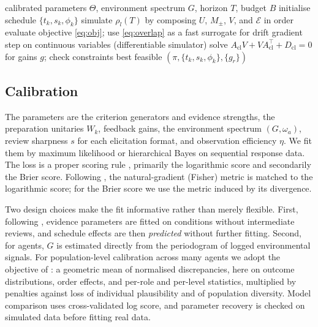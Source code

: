 \documentclass[11pt]{article}
\theoremstyle{definition}
\theoremstyle{remark}
\begin{document}
\begin{algorithm}[t]
\caption{Schedule and order optimisation}
\label{alg:opt}
\begin{algorithmic}[1]
\Require calibrated parameters $\Theta$, environment spectrum $G$, horizon $T$, budget $B$
  \State initialise schedule $\{t_k,s_k,\phi_k\}$
  \Repeat
    \State simulate $\rho_l(T)$ by composing $U$, $M_\pm$, $V$, and $\mathcal{E}$ in order
    \State evaluate objective \eqref{eq:obj}; use \eqref{eq:overlap} as a fast surrogate for drift
    \State gradient step on continuous variables (differentiable simulator)
  \State solve $A_{\mathrm{cl}}V+VA_{\mathrm{cl}}^\top+D_{\mathrm{cl}}=0$ for gains $g$; check constraints
\EndFor
\State \Return best feasible $(\pi,\{t_k,s_k,\phi_k\},\{g_r\})$
\end{algorithmic}
\end{algorithm}

\subsection{Calibration}
The parameters are the criterion generators and evidence strengths, the preparation unitaries $W_k$, feedback gains, the environment spectrum $(G,\omega_a)$, review sharpness $s$ for each elicitation format, and observation efficiency $\eta$. We fit them by maximum likelihood or hierarchical Bayes on sequential response data. The loss is a proper scoring rule \citep{gneiting2007}, primarily the logarithmic score and secondarily the Brier score. Following \citet{drissi2025}, the natural-gradient (Fisher) metric is matched to the logarithmic score; for the Brier score we use the metric induced by its divergence.

Two design choices make the fit informative rather than merely flexible. First, following \citet{yearsley2016}, evidence parameters are fitted on conditions without intermediate reviews, and schedule effects are then \emph{predicted} without further fitting. Second, for agents, $G$ is estimated directly from the periodogram of logged environmental signals. For population-level calibration across many agents we adopt the objective of \citet{bougie2026cityreal}: a geometric mean of normalised discrepancies, here on outcome distributions, order effects, and per-role and per-level statistics, multiplied by penalties against loss of individual plausibility and of population diversity. Model comparison uses cross-validated log score, and parameter recovery is checked on simulated data before fitting real data.
\end{document}
